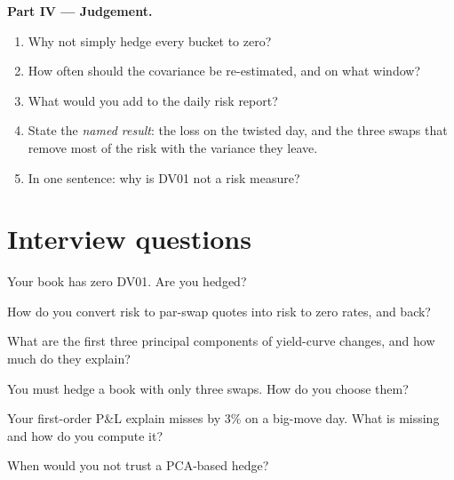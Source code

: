 \begin{problem}
\medskip\noindent\textbf{Part IV --- Judgement.}
\begin{enumerate}[resume]
\item Why not simply hedge every bucket to zero?
\item How often should the covariance be re-estimated, and on what window?
\item What would you add to the daily risk report?
\item State the \emph{named result}: the loss on the twisted day, and the three
swaps that remove most of the risk with the variance they leave.
\item In one sentence: why is DV01 not a risk measure?
\end{enumerate}
\end{problem}

\section{Interview questions}

\begin{interviewq}\label{iq:rc:rates-risk:1}
Your book has zero DV01. Are you hedged?
\end{interviewq}

\begin{interviewq}\label{iq:rc:rates-risk:2}
How do you convert risk to par-swap quotes into risk to zero rates, and back?
\end{interviewq}

\begin{interviewq}\label{iq:rc:rates-risk:3}
What are the first three principal components of yield-curve changes, and how
much do they explain?
\end{interviewq}

\begin{interviewq}\label{iq:rc:rates-risk:4}
You must hedge a book with only three swaps. How do you choose them?
\end{interviewq}

\begin{interviewq}\label{iq:rc:rates-risk:5}
Your first-order P\&L explain misses by 3\% on a big-move day. What is missing
and how do you compute it?
\end{interviewq}

\begin{interviewq}\label{iq:rc:rates-risk:6}
When would you not trust a PCA-based hedge?
\end{interviewq}
